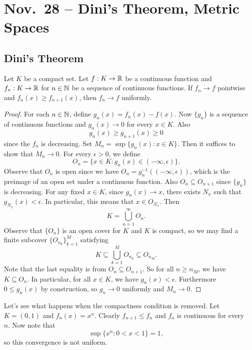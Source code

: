 \chapter{Nov.~28 -- Dini's Theorem, Metric Spaces}

\section{Dini's Theorem}

\begin{theorem}
  Let $K$ be a compact set. Let $f : K \to \mathbb{R}$
  be a continuous function and $f_{n} : K \to \mathbb{R}$ for
  $n \in \mathbb{N}$
  be a sequence of continuous functions. If $f_n \to f$
  pointwise and $f_n(x) \ge f_{n + 1}(x)$, then $f_n \to f$
  uniformly.
\end{theorem}

\begin{proof}
  For each $n \in \mathbb{N}$, define $g_n(x) = f_n(x) - f(x)$. Now
  $\{g_n\}$ is a sequence of continuous functions and
  $g_n(x) \to 0$ for every $x \in K$. Also
  \[g_n(x) \ge g_{n + 1}(x) \ge 0\]
  since the $f_n$ is decreasing.
  Set $M_n = \sup \{g_n(x) : x \in K\}$. Then it suffices to
  show that $M_n \to 0$. For every $\epsilon > 0$, we define
  \[
    O_n = \{x \in K : g_n(x) \in (-\infty, \epsilon)\}.
  \]
  Observe that $O_n$ is open since we have
  $O_n = g_n^{-1}((-\infty, \epsilon))$, which is the
  preimage of an open set under a continuous function.
  Also $O_n \subseteq O_{n + 1}$ since $\{g_n\}$ is
  decreasing.
  For any fixed $x \in K$, since $g_n(x) \to x$, there
  exists $N_x$ such that $g_{N_x}(x) < \epsilon$. In
  particular, this means that $x \in O_{N_x}$. Then
  \[
    K = \bigcup_{n = 1}^\infty O_n.
  \]
  Observe that $\{O_n\}$ is an open cover for $K$ and $K$
  is compact, so
  we may find a finite subcover
  $\{O_{n_k}\}_{k = 1}^M$ satisfying
  \[
    K \subseteq \bigcup_{k = 1}^M O_{n_k} \subseteq O_{n_M}.
  \]
  Note that the last equality is from
  $O_n \subseteq O_{n + 1}$. So for all $n \ge n_M$,
  we have $K \subseteq O_n$. In particular, for all
  $x \in K$, we have $g_n(x) < \epsilon$. Furthermore
  $0 \le g_n(x)$ by construction, so $g_n \to 0$
  uniformly and $M_n \to 0$.
\end{proof}

\begin{example}
  Let's see what happens when the compactness condition
  is removed. Let $K = (0, 1)$ and $f_n(x) = x^n$.
  Clearly $f_{n + 1} \le f_n$ and $f_n$ is continuous
  for every $n$. Now note that
  \[\sup\{x^n : 0 < x < 1\} = 1,\]
  so this convergence is not uniform.
\end{example}

